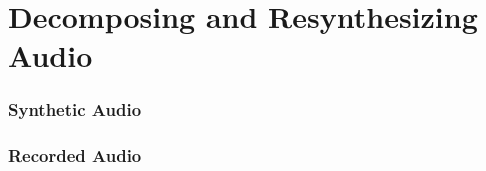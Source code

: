 \chapter{Decomposing and Resynthesizing Audio}


\subsection{Synthetic Audio}

\subsection{Recorded Audio}

